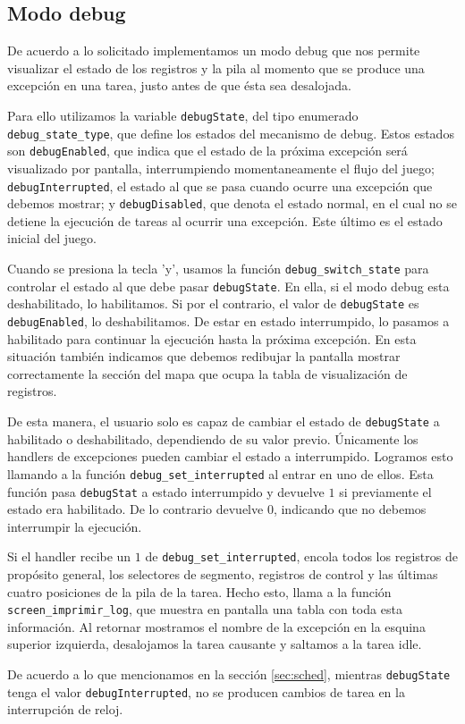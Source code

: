 \subsection{Modo debug}
\label{sec:debug}
De acuerdo a lo solicitado implementamos un modo debug que nos permite visualizar el estado de los registros y la pila al momento que se produce una excepción en una tarea, justo antes de que ésta sea desalojada.

Para ello utilizamos la variable \verb|debugState|, del tipo enumerado \verb|debug_state_type|, que define los estados del mecanismo de debug.
Estos estados son \verb|debugEnabled|, que indica que el estado de la próxima excepción será visualizado por pantalla, interrumpiendo momentaneamente el flujo del juego; \verb|debugInterrupted|, el estado al que se pasa cuando ocurre una excepción que debemos mostrar; y \verb|debugDisabled|, que denota el estado normal, en el cual no se detiene la ejecución de tareas al ocurrir una excepción. Este último es el estado inicial del juego.

Cuando se presiona la tecla 'y', usamos la función \verb|debug_switch_state| para controlar el estado al que debe pasar \verb|debugState|. En ella, si el modo debug esta deshabilitado, lo habilitamos. Si por el contrario, el valor de \verb|debugState| es \verb|debugEnabled|, lo deshabilitamos.
De estar en estado interrumpido, lo pasamos a habilitado para continuar la ejecución hasta la próxima excepción. 
En esta situación también indicamos que debemos redibujar la pantalla mostrar correctamente la sección del mapa que ocupa la tabla de visualización de registros.

De esta manera, el usuario solo es capaz de cambiar el estado de \verb|debugState| a habilitado o deshabilitado, dependiendo de su valor previo. Únicamente los handlers de excepciones pueden cambiar el estado a interrumpido. Logramos esto llamando a la función \verb|debug_set_interrupted| al entrar en uno de ellos. 
Esta función pasa \verb|debugStat| a estado interrumpido y devuelve $1$ si previamente el estado era habilitado. De lo contrario devuelve $0$, indicando que no debemos interrumpir la ejecución.

Si el handler recibe un $1$ de \verb|debug_set_interrupted|, encola todos los registros de propósito general, los selectores de segmento, registros de control y las últimas cuatro posiciones de la pila de la tarea. Hecho esto, llama a la función \verb|screen_imprimir_log|, que muestra en pantalla una tabla con toda esta información.
Al retornar mostramos el nombre de la excepción en la esquina superior izquierda, desalojamos la tarea causante y saltamos a la tarea idle.

De acuerdo a lo que mencionamos en la sección \ref{sec:sched}, mientras \verb|debugState| tenga el valor \verb|debugInterrupted|, no se producen cambios de tarea en la interrupción de reloj.

